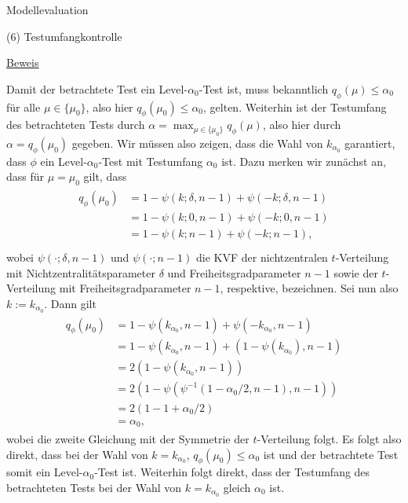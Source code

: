 \documentclass[
  8pt,
  ignorenonframetext,
]{beamer}
\begin{document}
\begin{frame}{Modellevaluation}
\protect\hypertarget{modellevaluation-12}{}

\noindent (6) Testumfangkontrolle 

\footnotesize

\underline{Beweis}

Damit der betrachtete Test ein Level-\(\alpha_0\)-Test ist, muss
bekanntlich \(q_\phi(\mu) \le \alpha_0\) für alle \(\mu \in \{\mu_0\}\),
also hier \(q_\phi(\mu_0) \le \alpha_0\), gelten. Weiterhin ist der
Testumfang des betrachteten Tests durch
\(\alpha = \max_{\mu \in \{\mu_0\}} q_\phi(\mu)\), also hier durch
\(\alpha = q_\phi(\mu_0)\) gegeben. Wir müssen also zeigen, dass die
Wahl von \(k_{\alpha_0}\) garantiert, dass \(\phi\) ein
Level-\(\alpha_0\)-Test mit Testumfang \(\alpha_0\) ist. Dazu merken wir
zunächst an, dass für \(\mu = \mu_0\) gilt, dass \begin{align}
\begin{split}
q_\phi(\mu_0)
& =  1 - \psi(k;\delta,n-1) + \psi(-k;\delta,n-1)                          \\
& =  1 - \psi(k;0,n-1) + \psi(-k;0,n-1)                                          \\
& =  1 - \psi(k;n-1) + \psi(-k;n-1),                                             \\
\end{split}
\end{align} wobei \(\psi(\cdot;\delta,n-1)\) und \(\psi(\cdot;n-1)\) die
KVF der nichtzentralen \(t\)-Verteilung mit Nichtzentralitätsparameter
\(\delta\) und Freiheitsgradparameter \(n-1\) sowie der \(t\)-Verteilung
mit Freiheitsgradparameter \(n-1\), respektive, bezeichnen. Sei nun also
\(k := k_{\alpha_0}\). Dann gilt \begin{align}
\begin{split}
q_\phi(\mu_0)
& = 1 - \psi(k_{\alpha_0}, n-1) + \psi(-k_{\alpha_0}, n-1)                                 \\
& = 1 - \psi(k_{\alpha_0}, n-1) + (1 - \psi(k_{\alpha_0}), n-1)                            \\
& = 2(1-\psi(k_{\alpha_0}, n-1))                                                      \\
& = 2\left(1-\psi\left(\psi^{-1}\left(1 - \alpha_0/2 , n-1\right), n-1\right)\right) \\
& = 2\left(1 - 1 + \alpha_0/2\right)                          \\
& = \alpha_0,
\end{split}
\end{align} wobei die zweite Gleichung mit der Symmetrie der
\(t\)-Verteilung folgt. Es folgt also direkt, dass bei der Wahl von
\(k = k_{\alpha_0}\), \(q_\phi(\mu_0)\le \alpha_0\) ist und der
betrachtete Test somit ein Level-\(\alpha_0\)-Test ist. Weiterhin folgt
direkt, dass der Testumfang des betrachteten Tests bei der Wahl von
\(k = k_{\alpha_0}\) gleich \(\alpha_0\) ist.
\end{frame}
\end{document}
